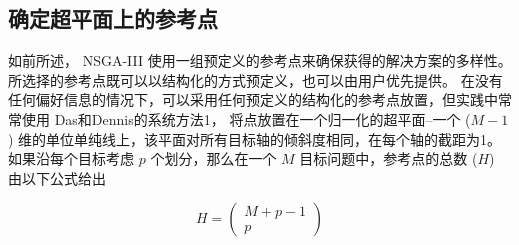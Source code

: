 \subsection{确定超平面上的参考点}

如前所述， NSGA-III 使用一组预定义的参考点来确保获得的解决方案的多样性。
所选择的参考点既可以以结构化的方式预定义，也可以由用户优先提供。
在没有任何偏好信息的情况下，可以采用任何预定义的结构化的参考点放置，但实践中常常使用 Das和Dennis的\cite{das&dennis2000}系统方法1，
将点放置在一个归一化的超平面--一个 ($M-1$) 维的单位单纯线上，该平面对所有目标轴的倾斜度相同，在每个轴的截距为1。
如果沿每个目标考虑 $p$ 个划分，那么在一个 $M$ 目标问题中，参考点的总数 ($H$) 由以下公式给出

\begin{equation}\label{eq:H}
    H = \begin{pmatrix}
        M + p - 1 \\
        p
    \end{pmatrix}
\end{equation}

